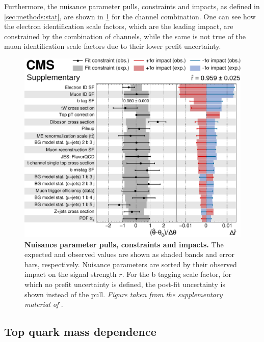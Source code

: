 Furthermore, the nuisance parameter pulls, constraints and impacts, as defined in \cref{sec:methods:stat}, are shown in \cref{fig:ttxs:impacts} for the channel combination. One can see how the electron identification scale factors, which are the leading impact, are constrained by the combination of channels, while the same is not true of the muon identification scale factors due to their lower prefit uncertainty.

\begin{figure}[!ht]
    \centering
    \includegraphics[width=0.9\linewidth]{figures/ttxs/impacts_v2.pdf}
    \caption{\textbf{Nuisance parameter pulls, constraints and impacts.} The expected and observed values are shown as shaded bands and error bars, respectively. Nuisance parameters are sorted by their observed impact on the signal strength $r$. For the b tagging scale factor, for which no prefit uncertainty is defined, the post-fit uncertainty is shown instead of the pull. \textit{Figure taken from the supplementary material of }.}
    \label{fig:ttxs:impacts}
\end{figure}



\subsection{Top quark mass dependence}
\label{sec:ttxs:topmass}

